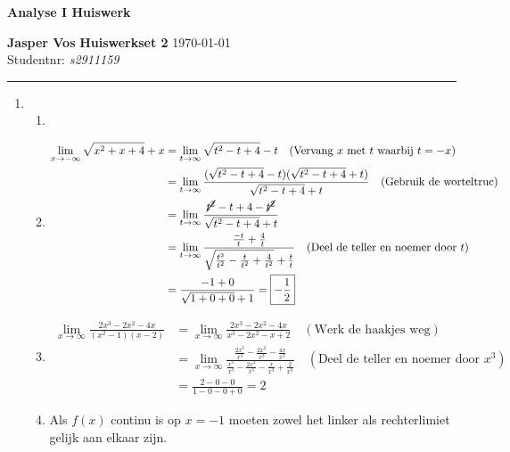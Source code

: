 \documentclass{article}
\begin{document}
{\Large \textbf{Analyse I Huiswerk}}

\bigskip

\textbf{Jasper Vos} \hfill \textbf{Huiswerkset 2} \hfill \today \\
Studentnr: \emph{s2911159} 

\rule{\textwidth}{2pt}

\bigskip

\begin{enumerate}
    \item
    \begin{enumerate}[label=\alph*)]
        \item
        \item
            \begin{align*}
                \lim_{x \rightarrow -\infty} \sqrt{x^2+x+4} + x &= \lim_{t \rightarrow \infty} \sqrt{t^2-t+4}-t \quad (\text{Vervang $x$ met $t$ waarbij $t=-x$})\\
                &= \lim_{t \rightarrow \infty} \frac{(\sqrt{t^2-t+4}-t)(\sqrt{t^2-t+4}+t)}{\sqrt{t^2-t+4}+t} \quad (\text{Gebruik de worteltruc})\\ 
                &= \lim_{t \rightarrow \infty} \frac{\cancel{t^2}-t+4-\cancel{t^2}}{\sqrt{t^2-t+4}+t} \\
                &= \lim_{t \rightarrow \infty} \frac{\frac{-t}{t}+\frac{4}{t}}{\sqrt{\frac{t^2}{t^2}-\frac{t}{t^2}+\frac{4}{t^2}} + \frac{t}{t}} \quad (\text{Deel de teller en noemer door $t$})\\
                &= \frac{-1 + 0}{\sqrt{1+0+0}+1} = \boxed{-\frac{1}{2}}
            \end{align*}
        \item
            \begin{align*}
                \lim_{x \rightarrow \infty} \frac{2x^3-2x^2-4x}{(x^2-1)(x-2)} &= \lim_{x \rightarrow \infty} \frac{2x^3-2x^2-4x}{x^3-2x^2-x+2} \quad (\text{Werk de haakjes weg}) \\
                &= \lim_{x \rightarrow \infty} \frac{\frac{2x^3}{x^3}-\frac{2x^2}{x^3}-\frac{4x}{x^3}}{\frac{x^3}{x^3}-\frac{2x^2}{x^3}-\frac{x}{x^3}+\frac{2}{x^3}} \quad (\text{Deel de teller en noemer door $x^3$})\\
                &= \frac{2-0-0}{1-0-0+0} = \boxed{2}
            \end{align*}
        \item
            Als $f(x)$ continu is op $x=-1$ moeten zowel het linker als rechterlimiet gelijk aan elkaar zijn. 
            \begin{align*}

\end{align*}
\end{enumerate}
\end{enumerate}
\end{document}
